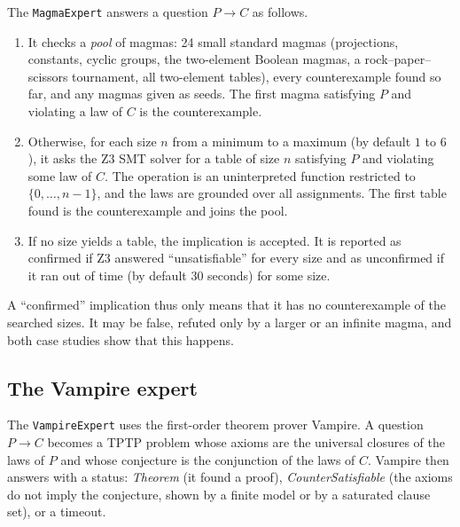 \documentclass[11pt,a4paper]{article}
\theoremstyle{definition}
\theoremstyle{remark}
\newcommand{\code}[1]{\texttt{#1}}
\begin{document}
The \code{MagmaExpert} answers a question $P \to C$ as follows.
\begin{enumerate}
  \item It checks a \emph{pool} of magmas: 24 small standard magmas (projections, constants, cyclic groups, the two-element Boolean magmas, a rock--paper--scissors tournament, all two-element tables), every counterexample found so far, and any magmas given as seeds. The first magma satisfying $P$ and violating a law of $C$ is the counterexample.
  \item Otherwise, for each size $n$ from a minimum to a maximum (by default $1$ to $6$), it asks the Z3 SMT solver for a table of size $n$ satisfying $P$ and violating some law of $C$. The operation is an uninterpreted function restricted to $\{0, \dots, n-1\}$, and the laws are grounded over all assignments. The first table found is the counterexample and joins the pool.
  \item If no size yields a table, the implication is accepted. It is reported as confirmed if Z3 answered ``unsatisfiable'' for every size and as unconfirmed if it ran out of time (by default 30 seconds) for some size.
\end{enumerate}
A ``confirmed'' implication thus only means that it has no counterexample of the searched sizes. It may be false, refuted only by a larger or an infinite magma, and both case studies show that this happens.

\subsection{The Vampire expert}\label{sec:vampire}

The \code{VampireExpert} uses the first-order theorem prover Vampire. A question $P \to C$ becomes a TPTP problem whose axioms are the universal closures of the laws of $P$ and whose conjecture is the conjunction of the laws of $C$. Vampire then answers with a status: \emph{Theorem} (it found a proof), \emph{CounterSatisfiable} (the axioms do not imply the conjecture, shown by a finite model or by a saturated clause set), or a timeout.
\end{document}
